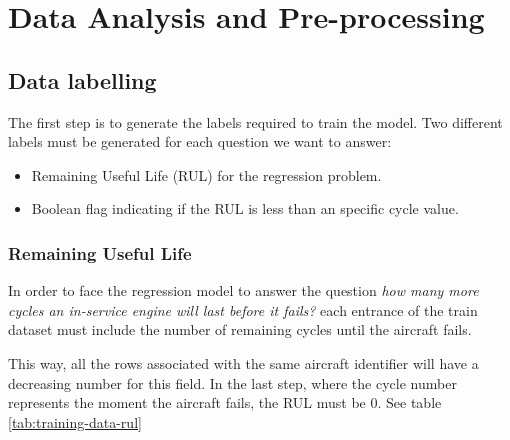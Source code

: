 
\chapter{Data Analysis and Pre-processing} %

\label{Chapter3}


\section{Data labelling}

The first step is to generate the labels required to train the model.
Two different labels must be generated for each question we want to answer:

\begin{itemize}
    \item Remaining Useful Life (RUL) for the regression problem.
    \item Boolean flag indicating if the RUL is less than an specific cycle value.
\end{itemize}

\subsection{Remaining Useful Life}

In order to face the regression model to answer the question \textit{how many more cycles an in-service engine will last before it fails?} each entrance of the train dataset must include the number of remaining cycles until the aircraft fails.

This way, all the rows associated with the same aircraft identifier will have a decreasing number for this field. In the last step, where the cycle number represents the moment the aircraft fails, the RUL must be 0. See table \ref{tab:training-data-rul}

